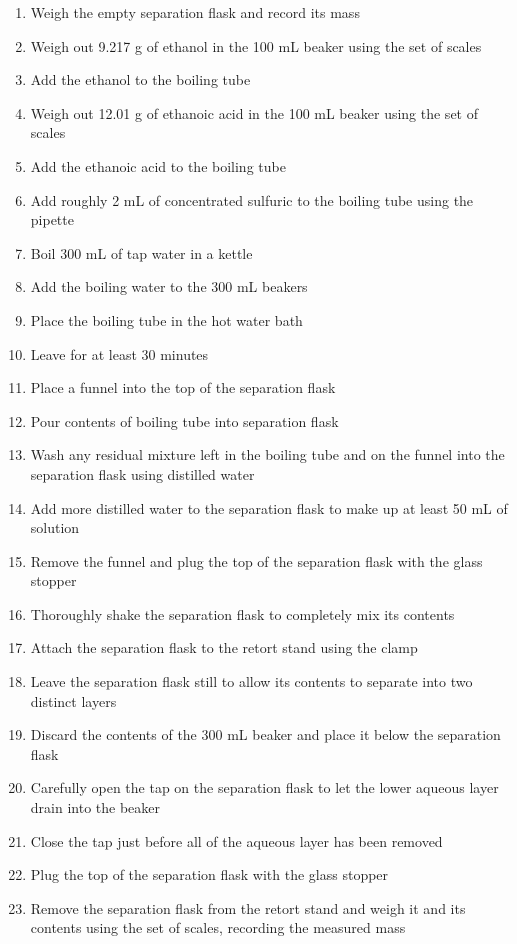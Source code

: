\documentclass[a4paper,11pt]{article}
\begin{document}
\begin{enumerate}
\item Weigh the empty separation flask and record its mass
\item Weigh out 9.217 g of ethanol in the 100 mL beaker using the set of scales
\item Add the ethanol to the boiling tube
\item Weigh out 12.01 g of ethanoic acid in the 100 mL beaker using the set of
	scales
\item Add the ethanoic acid to the boiling tube
\item Add roughly 2 mL of concentrated sulfuric to the boiling tube using the pipette
\item Boil 300 mL of tap water in a kettle
\item Add the boiling water to the 300 mL beakers
\item Place the boiling tube in the hot water bath
\item Leave for at least 30 minutes
\item Place a funnel into the top of the separation flask
\item Pour contents of boiling tube into separation flask
\item Wash any residual mixture left in the boiling tube and on the funnel into the separation flask using distilled water
\item Add more distilled water to the separation flask to make up at least 50 mL
	of solution
\item Remove the funnel and plug the top of the separation flask with the glass stopper
\item Thoroughly shake the separation flask to completely mix its contents
\item Attach the separation flask to the retort stand using the clamp
\item Leave the separation flask still to allow its contents to separate into two
	distinct layers
\item Discard the contents of the 300 mL beaker and place it below the separation flask
\item Carefully open the tap on the separation flask to let the lower aqueous layer drain into the beaker
\item Close the tap just before all of the aqueous layer has been removed
\item Plug the top of the separation flask with the glass stopper
\item Remove the separation flask from the retort stand and weigh it and its
	contents using the set of scales, recording the measured mass



\end{enumerate}
\end{document}
